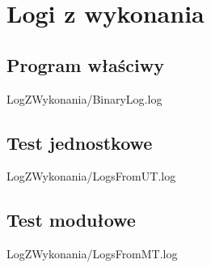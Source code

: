 \chapter{Logi z wykonania}
    \section{Program właściwy}
        
        {LogZWykonania/BinaryLog.log}
    \section{Test jednostkowe}
        
        {LogZWykonania/LogsFromUT.log}
    \section{Test modułowe}
        
        {LogZWykonania/LogsFromMT.log}
        
